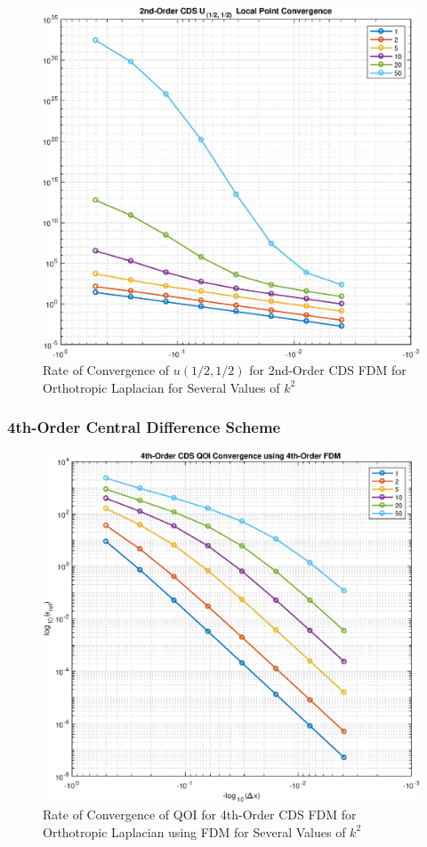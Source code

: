 \documentclass[10pt]{article}		%
\numberwithin{equation}{section}
\begin{document}
\begin{table}[H]
	
\end{table}

\begin{figure}[H]
	\begin{center}
		\includegraphics[width = 0.8\linewidth]{order_2_u_avg}
		\caption{Rate of Convergence of $u(1/2, 1/2)$ for 2nd-Order CDS FDM for Orthotropic Laplacian for Several Values of $k^2$}	
	\end{center}
\end{figure}

\begin{table}[H]
	
\end{table}

\newpage

\subsubsection{4th-Order Central Difference Scheme}

\begin{figure}[H]
	\begin{center}
		\includegraphics[width = 0.8\linewidth]{order_4_u_y_fdm}
		\caption{Rate of Convergence of QOI for 4th-Order CDS FDM for Orthotropic Laplacian using FDM for Several Values of $k^2$}	
	\end{center}
\end{figure}
\end{document}
